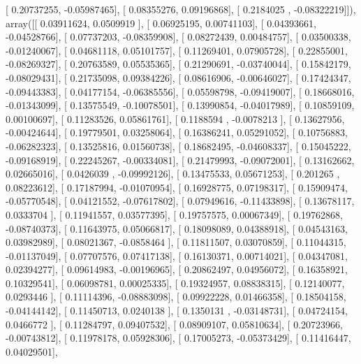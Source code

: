 \documentclass{article}
\begin{document}
       [ 0.20737255, -0.05987465],
       [ 0.08355276,  0.09196868],
       [ 0.2184025 , -0.08322219]]), array([[ 0.03911624,  0.0509919 ],
       [ 0.06925195,  0.00741103],
       [ 0.04393661, -0.04528766],
       [ 0.07737203, -0.08359908],
       [ 0.08272439,  0.00484757],
       [ 0.03500338, -0.01240067],
       [ 0.04681118,  0.05101757],
       [ 0.11269401,  0.07905728],
       [ 0.22855001, -0.08269327],
       [ 0.20763589,  0.05535365],
       [ 0.21290691, -0.03740044],
       [ 0.15842179, -0.08029431],
       [ 0.21735098,  0.09384226],
       [ 0.08616906, -0.00646027],
       [ 0.17424347, -0.09443383],
       [ 0.04177154, -0.06385556],
       [ 0.05598798, -0.09419007],
       [ 0.18668016, -0.01343099],
       [ 0.13575549, -0.10078501],
       [ 0.13990854, -0.04017989],
       [ 0.10859109,  0.00100697],
       [ 0.11283526,  0.05861761],
       [ 0.1188594 , -0.0078213 ],
       [ 0.13627956, -0.00424644],
       [ 0.19779501,  0.03258064],
       [ 0.16386241,  0.05291052],
       [ 0.10756883, -0.06282323],
       [ 0.13525816,  0.01560738],
       [ 0.18682495, -0.04608337],
       [ 0.15045222, -0.09168919],
       [ 0.22245267, -0.00334081],
       [ 0.21479993, -0.09072001],
       [ 0.13162662,  0.02665016],
       [ 0.0426039 , -0.09992126],
       [ 0.13475533,  0.05671253],
       [ 0.201265  ,  0.08223612],
       [ 0.17187994, -0.01070954],
       [ 0.16928775,  0.07198317],
       [ 0.15909474, -0.05770548],
       [ 0.04121552, -0.07617802],
       [ 0.07949616, -0.11433898],
       [ 0.13678117,  0.0333704 ],
       [ 0.11941557,  0.03577395],
       [ 0.19757575,  0.00067349],
       [ 0.19762868, -0.08740373],
       [ 0.11643975,  0.05066817],
       [ 0.18098089,  0.04388918],
       [ 0.04543163,  0.03982989],
       [ 0.08021367, -0.0858464 ],
       [ 0.11811507,  0.03070859],
       [ 0.11044315, -0.01137049],
       [ 0.07707576,  0.07417138],
       [ 0.16130371,  0.00714021],
       [ 0.04347081,  0.02394277],
       [ 0.09614983, -0.00196965],
       [ 0.20862497,  0.04956072],
       [ 0.16358921,  0.10329541],
       [ 0.06098781,  0.00025335],
       [ 0.19324957,  0.08838315],
       [ 0.12140077,  0.0293446 ],
       [ 0.11114396, -0.08883098],
       [ 0.09922228,  0.01466358],
       [ 0.18504158, -0.04144142],
       [ 0.11450713,  0.0240138 ],
       [ 0.1350131 , -0.03148731],
       [ 0.04724154,  0.0466772 ],
       [ 0.11284797,  0.09407532],
       [ 0.08909107,  0.05810634],
       [ 0.20723966, -0.00743812],
       [ 0.11978178,  0.05928306],
       [ 0.17005273, -0.05373429],
       [ 0.11416447,  0.04029501],
\end{document}

